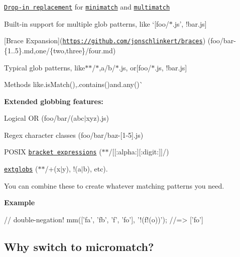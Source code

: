 \begin{DoxyItemize}
\item \href{#switch-from-minimatch}{\tt Drop-\/in replacement} for \href{https://github.com/isaacs/minimatch}{\tt minimatch} and \href{https://github.com/sindresorhus/multimatch}{\tt multimatch}
\item Built-\/in support for multiple glob patterns, like `\mbox{[}\textquotesingle{}foo/$\ast$.js', \textquotesingle{}!bar.js\textquotesingle{}\mbox{]}{\ttfamily }
\item {\ttfamily \mbox{[}Brace Expansion\mbox{]}(\href{https://github.com/jonschlinkert/braces}{\tt https\+://github.\+com/jonschlinkert/braces}) (}foo/bar-\/\{1..5\}.md{\ttfamily ,}one/\{two,three\}/four.md{\ttfamily )}
\item {\ttfamily Typical glob patterns, like}$\ast$$\ast$/$\ast${\ttfamily ,}a/b/$\ast$.js{\ttfamily , or}\mbox{[}\textquotesingle{}foo/$\ast$.js\textquotesingle{}, \textquotesingle{}!bar.js\textquotesingle{}\mbox{]}{\ttfamily }
\item {\ttfamily Methods like}.is\+Match(){\ttfamily ,}.contains(){\ttfamily and}.any()\`{}
\end{DoxyItemize}

{\bfseries Extended globbing features\+:}


\begin{DoxyItemize}
\item Logical {\ttfamily OR} ({\ttfamily foo/bar/(abc$\vert$xyz).js})
\item Regex character classes ({\ttfamily foo/bar/baz-\/\mbox{[}1-\/5\mbox{]}.js})
\item P\+O\+S\+IX \href{https://github.com/jonschlinkert/expand-brackets}{\tt bracket expressions} ({\ttfamily $\ast$$\ast$/\mbox{[}\mbox{[}\+:alpha\+:\mbox{]}\mbox{[}\+:digit\+:\mbox{]}\mbox{]}/})
\item \href{https://github.com/jonschlinkert/extglob}{\tt extglobs} ({\ttfamily $\ast$$\ast$/+(x$\vert$y)}, {\ttfamily !(a$\vert$b)}, etc).
\end{DoxyItemize}

You can combine these to create whatever matching patterns you need.

{\bfseries Example}


\begin{DoxyCode}
// double-negation!
mm(['fa', 'fb', 'f', 'fo'], '!(f!(o))');
//=> ['fo']
\end{DoxyCode}


\subsection*{Why switch to micromatch?}


